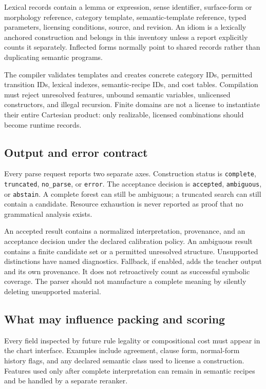 \documentclass[11pt,a4paper]{article}
\newcommand{\code}[1]{\texttt{#1}}
\begin{document}
Lexical records contain a lemma or expression, sense identifier, surface-form
or morphology reference, category template, semantic-template reference,
typed parameters, licensing conditions, source, and revision. An idiom is a
lexically anchored construction and belongs in this inventory unless a report
explicitly counts it separately. Inflected forms normally point to shared
records rather than duplicating semantic programs.

The compiler validates templates and creates concrete category IDs, permitted
transition IDs, lexical indexes, semantic-recipe IDs, and cost tables.
Compilation must reject unresolved features, unbound semantic variables,
unlicensed constructors, and illegal recursion. Finite domains are not a
license to instantiate their entire Cartesian product: only realizable,
licensed combinations should become runtime records.

\subsection{Output and error contract}
Every parse request reports two separate axes. Construction status is
\code{complete}, \code{truncated}, \code{no\_parse}, or \code{error}.
The acceptance decision is \code{accepted}, \code{ambiguous}, or
\code{abstain}. A complete forest can still be ambiguous; a truncated search
can still contain a candidate. Resource exhaustion is never reported as
proof that no grammatical analysis exists.

An accepted result contains a normalized interpretation, provenance, and an
acceptance decision under the declared calibration policy. An ambiguous result
contains a finite candidate set or a permitted unresolved structure.
Unsupported distinctions have named diagnostics. Fallback, if enabled, adds
the teacher output and its own provenance. It does not retroactively count as
successful symbolic coverage. The parser should not manufacture a complete
meaning by silently deleting unsupported material.

\subsection{What may influence packing and scoring}
Every field inspected by future rule legality or compositional cost must
appear in the chart interface. Examples include agreement, clause form,
normal-form history flags, and any declared semantic class used to license
a construction. Features used only after complete interpretation can remain
in semantic recipes and be handled by a separate reranker.
\end{document}

